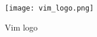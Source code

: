 \begin{frame}[fragile]
  \frametitle{\vimwebsite}
  \begin{figure}
    \centering
    \texttt{[image: vim\_logo.png]}
    \caption{Vim logo}
    \label{fig:vim-logo}
  \end{figure}
\end{frame}
